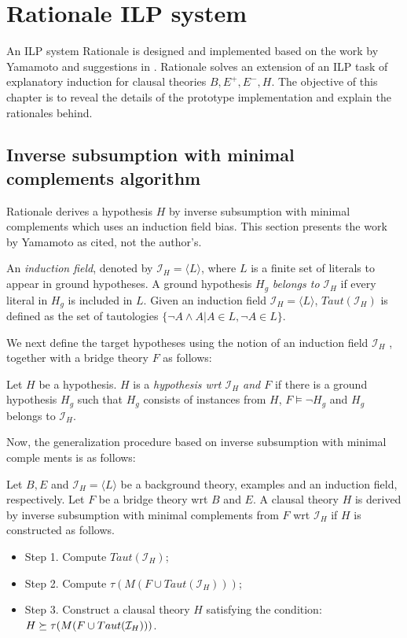 \chapter{Rationale ILP system}
An ILP system Rationale is designed and implemented based on the work by Yamamoto\cite{yamamoto2012inverse} and suggestions in . Rationale solves an extension of an ILP task of explanatory induction for clausal theories $B, E^+, E^-, H$. The objective of this chapter is to reveal the details of the prototype implementation and explain the rationales behind.

\section{Inverse subsumption with minimal complements algorithm}\cite{yamamoto2012inverse}
Rationale derives a hypothesis $H$ by inverse subsumption with minimal complements\cite{yamamoto2012inverse} which uses an induction field bias. This section presents the work by Yamamoto as cited, not the author's.

\begin{defn}\label{induction_field_definition}
An \emph{induction field}, denoted by $\mathcal{I}_H = \langle L \rangle$,
where $L$ is a finite
set of literals to appear in ground hypotheses.
A ground hypothesis $H_g$ \emph{belongs to} $\mathcal{I}_H$ if
every literal in $H_g$ is included in $L$.
Given an induction field $\mathcal{I}_H = \langle L \rangle$, $Taut(\mathcal{I}_H)$ is defined
as the set of tautologies $\{\neg A \land A | A \in L, \neg A \in L\}$.
\end{defn}

We next define the target hypotheses using the notion of an induction field $\mathcal{I}_H$ , together with a bridge theory $F$ as follows:

\begin{defn}
Let $H$ be a hypothesis. $H$ is a \emph{hypothesis wrt $\mathcal{I}_H$ and $F$} if there is a ground hypothesis $H_g$ such that $H_g$ consists of instances from $H$,
$F \models \neg H_g$ and $H_g$ belongs to $\mathcal{I}_H$.
\end{defn}

Now, the generalization procedure based on inverse subsumption with minimal comple
ments is as follows:

\begin{defn}
Let $B, E$ and $\mathcal{I}_H = \langle L \rangle$ be a background theory, examples and an induction
field, respectively. Let $F$ be a bridge theory wrt $B$ and $E$. A clausal theory $H$ is derived
by inverse subsumption with minimal complements from $F$ wrt $\mathcal{I}_H$ if $H$ is constructed as follows.
\begin{itemize}
\item Step 1. Compute $Taut(\mathcal{I}_H)$;
\item Step 2. Compute $\tau(M(F \cup Taut(\mathcal{I}_H)))$;
\item Step 3. Construct a clausal theory $H$ satisfying the condition:
$H \succeq \tau(M(F \cup Taut(\mathcal{I}_H)))$.
\end{itemize}
\end{defn}

